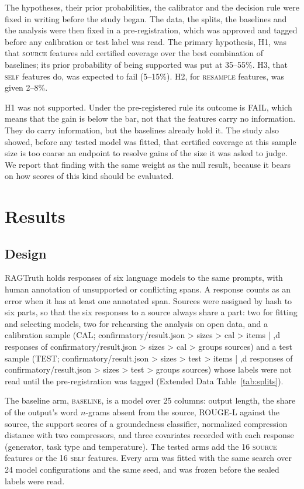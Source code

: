 \documentclass[11pt]{article}
\newcommand{\arm}[1]{\textsc{#1}}
\begin{document}
The hypotheses, their prior probabilities, the calibrator and the decision rule were fixed in writing before the study began. The data, the splits, the baselines and the analysis were then fixed in a pre-registration, which was approved and tagged before any calibration or test label was read. The primary hypothesis, H1, was that \arm{source} features add certified coverage over the best combination of baselines; its prior probability of being supported was put at 35--55\%. H3, that \arm{self} features do, was expected to fail (5--15\%). H2, for \arm{resample} features, was given 2--8\%.

H1 was not supported. Under the pre-registered rule its outcome is FAIL, which means that the gain is below the bar, not that the features carry no information. They do carry information, but the baselines already hold it. The study also showed, before any tested model was fitted, that certified coverage at this sample size is too coarse an endpoint to resolve gains of the size it was asked to judge. We report that finding with the same weight as the null result, because it bears on how scores of this kind should be evaluated.

\section*{Results}

\subsection*{Design}

RAGTruth\cite{ragtruth} holds responses of six language models to the same prompts, with human annotation of unsupported or conflicting spans. A response counts as an error when it has at least one annotated span. Sources were assigned by hash to six parts, so that the six responses to a source always share a part: two for fitting and selecting models, two for rehearsing the analysis on open data, and a calibration sample (CAL; {{confirmatory/result.json > sizes > cal > items | ,d}} responses of {{confirmatory/result.json > sizes > cal > groups}} sources) and a test sample (TEST; {{confirmatory/result.json > sizes > test > items | ,d}} responses of {{confirmatory/result.json > sizes > test > groups}} sources) whose labels were not read until the pre-registration was tagged (Extended Data Table~\ref{tab:splits}).

The baseline arm, \arm{baseline}, is a model over 25 columns: output length, the share of the output's word $n$-grams absent from the source, ROUGE-L against the source, the support scores of a groundedness classifier\cite{minicheck}, normalized compression distance\cite{ncd} with two compressors, and three covariates recorded with each response (generator, task type and temperature). The tested arms add the 16 \arm{source} features or the 16 \arm{self} features. Every arm was fitted with the same search over 24 model configurations and the same seed, and was frozen before the sealed labels were read.
\end{document}
